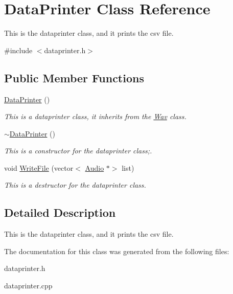 \hypertarget{classDataPrinter}{}\section{Data\+Printer Class Reference}
\label{classDataPrinter}


This is the dataprinter class, and it prints the csv file.  




{\ttfamily \#include $<$dataprinter.\+h$>$}

\subsection*{Public Member Functions}
\begin{DoxyCompactItemize}
\item 
\mbox{\label{classDataPrinter_a1f7a2bfb3f337cfd86bae5f37f3d91bb}} 
\hyperlink{classDataPrinter_a1f7a2bfb3f337cfd86bae5f37f3d91bb}{Data\+Printer} ()
\begin{DoxyCompactList}\small\item\em This is a dataprinter class, it inherits from the \hyperlink{classWav}{Wav} class. \end{DoxyCompactList}\item 
\mbox{\label{classDataPrinter_a4e134770745823d0b302d5adfdf44893}} 
\hyperlink{classDataPrinter_a4e134770745823d0b302d5adfdf44893}{$\sim$\+Data\+Printer} ()
\begin{DoxyCompactList}\small\item\em This is a constructor for the dataprinter class;. \end{DoxyCompactList}\item 
\mbox{\label{classDataPrinter_ae8950a33a94eb2f0685cefd137df894d}} 
void \hyperlink{classDataPrinter_ae8950a33a94eb2f0685cefd137df894d}{Write\+File} (vector$<$ \hyperlink{classAudio}{Audio} $\ast$$>$ list)
\begin{DoxyCompactList}\small\item\em This is a destructor for the dataprinter class. \end{DoxyCompactList}\end{DoxyCompactItemize}


\subsection{Detailed Description}
This is the dataprinter class, and it prints the csv file. 

The documentation for this class was generated from the following files\+:\begin{DoxyCompactItemize}
\item 
dataprinter.\+h\item 
dataprinter.\+cpp\end{DoxyCompactItemize}
